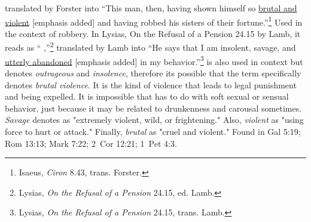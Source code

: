 translated by Forster into ``This man, then, having shown himself so \underline{brutal and violent} [emphasis added] and having robbed his sisters of their fortune.''\footnote{Isaeus, \emph{Ciron} 8.43, trans. Forster.} Used in the context of robbery. 
In Lysias, On the Refusal of a Pension 24.15 by Lamb, it reads as `` \underline{} ,''\footnote{Lysias, \emph{On the Refusal of a Pension} 24.15, ed. Lamb.}
translated by Lamb into ``He says that I am insolent, savage, and \underline{utterly abandoned} [emphasis added] in my behavior.''\footnote{Lysias, \emph{On the Refusal of a Pension} 24.15, trans. Lamb.}  
 is also used in context but denotes \emph{outrageous} and \emph{insolence}, therefore its possible that the term specifically denotes \emph{brutal violence}. It is the kind of violence that leads to legal punishment and being expelled. It is impossible that  has to do with soft sexual or sensual behavior, just because it may be related to drunkenness and carousal sometimes. \emph{Savage} denotes as "extremely violent, wild, or frightening." Also, \emph{violent} as "using force to hurt or attack." Finally, \emph{brutal} as "cruel and violent."
Found in Gal 5:19; Rom 13:13; Mark 7:22; 2~Cor 12:21; 1~Pet 4:3.
